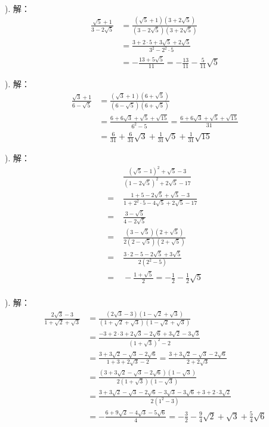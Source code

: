 \documentclass[12pt,UTF8,fontset=none]{ctexbook}
\begin{document}
\begin{so}
    \mbox{} \\
    ). 解：
    \begin{align*}
        \frac{\sqrt{5} + 1}{3 - 2\sqrt{5}} & = \frac{(\sqrt{5} + 1)(3 + 2\sqrt{5})}{(3 - 2\sqrt{5})(3 + 2\sqrt{5})} \\
        &= \frac{3 + 2\cdot 5 + 3\sqrt{5} + 2\sqrt{5}}{3^2 - 2^2\cdot 5} \\
        &= -\frac{13 + 5\sqrt{5}}{11} = -\frac{13}{11} - \frac{5}{11}\sqrt{5}
    \end{align*}
    
    ).  解：
    \begin{align*}
        \frac{\sqrt{3} + 1}{6 - \sqrt{5}} &= \frac{(\sqrt{3} + 1)(6 + \sqrt{5})}{(6 - \sqrt{5})(6 + \sqrt{5})} \\
        &= \frac{6 + 6\sqrt{3} + \sqrt{5} + \sqrt{15}}{6^2 - 5} = \frac{6 + 6\sqrt{3} + \sqrt{5} + \sqrt{15}}{31} \\
        &= \frac{6}{31} + \frac{6}{31}\sqrt{3} + \frac{1}{31}\sqrt{5} + \frac{1}{31}\sqrt{15}
    \end{align*}

    ).  解：
    \begin{align*}
        &\; \frac{(\sqrt{5} - 1)^2 + \sqrt{5} - 3}{(1 - 2\sqrt{5})^2 + 2\sqrt{5} - 17} \\
        =&\; \frac{1 + 5 - 2\sqrt{5} + \sqrt{5} - 3}{1 + 2^2\cdot 5 - 4\sqrt{5} + 2\sqrt{5} - 17} \\
        =&\; \frac{3 - \sqrt{5}}{4 - 2\sqrt{5}} \\
        =&\; \frac{(3 - \sqrt{5})(2 + \sqrt{5})}{2(2 - \sqrt{5})(2 + \sqrt{5})} \\
        =&\; \frac{3\cdot 2 - 5 - 2\sqrt{5} + 3\sqrt{5}}{2(2^2 - 5)} \\
        =&\; -\frac{1 + \sqrt{5}}{2} = -\frac{1}{2} - \frac{1}{2}\sqrt{5}\\
    \end{align*}

    ). 解：
    \begin{align*}
        \frac{2\sqrt{3} - 3}{1 + \sqrt{2} + \sqrt{3}} &= \frac{(2\sqrt{3} - 3)(1 - \sqrt{2} + \sqrt{3})}{(1 + \sqrt{2} + \sqrt{3})(1 - \sqrt{2} + \sqrt{3})} \\
        &= \frac{-3 + 2 \cdot 3 + 2\sqrt{3} - 2\sqrt{6} + 3\sqrt{2} - 3\sqrt{3}}{(1 + \sqrt{3})^2 - 2} \\
        &= \frac{3 + 3\sqrt{2} - \sqrt{3} - 2\sqrt{6}}{1 + 3 + 2\sqrt{3} - 2} = \frac{3 + 3\sqrt{2} - \sqrt{3} - 2\sqrt{6}}{2 + 2\sqrt{3}} \\
        &= \frac{(3 + 3\sqrt{2} - \sqrt{3} - 2\sqrt{6})(1 - \sqrt{3})}{2(1 + \sqrt{3})(1 - \sqrt{3})} \\
        &= \frac{3 + 3\sqrt{2} - \sqrt{3} - 2\sqrt{6} - 3\sqrt{3} - 3\sqrt{6} + 3 + 2\cdot 3\sqrt{2}}{2(1^2 - 3)} \\
        &= -\frac{6 + 9\sqrt{2} - 4\sqrt{3} - 5\sqrt{6}}{4} = -\frac{3}{2} - \frac{9}{4}\sqrt{2} + \sqrt{3} + \frac{5}{4}\sqrt{6}\\
    \end{align*}
\end{so}
\end{document}
